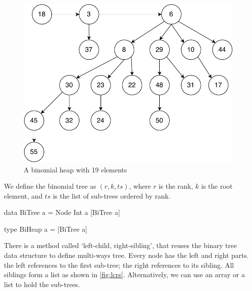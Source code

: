 \documentclass[b5paper]{article}
\begin{document}
\begin{figure}[htbp]
  \centering
  \includegraphics[scale=0.5]{img/binomial-heap}
  \caption{A binomial heap with 19 elements}
  \label{fig:bheap2}
\end{figure}

We define the binomial tree as $(r, k, ts)$, where $r$ is the rank, $k$ is the root element, and $ts$ is the list of sub-trees ordered by rank.

\lstset{frame=single}
\begin{Haskell}
data BiTree a = Node Int a [BiTree a]

type BiHeap a = [BiTree a]
\end{Haskell}

There is a method called `left-child, right-sibling'\cite{CLRS}, that reuses the binary tree data structure to define multi-ways tree. Every node has the left and right parts. the left references to the first sub-tree; the right references to its sibling. All siblings form a list as shown in \cref{fig:lcrs}. Alternatively, we can use an array or a list to hold the sub-trees.
\end{document}
